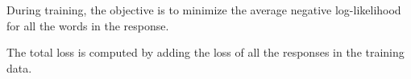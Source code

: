 During training, the objective is to minimize the average negative log-likelihood for all the words in the response.
\begin{comment}
\begin{gather}
\mathcal{L}=-\frac{1}{T}\sum\nolimits_{t=1}^{T}log  P_{g}(y_t)
\label{eq:loss}
\end{gather}
\end{comment}
The total loss is computed by adding the loss of all the responses in the training data.